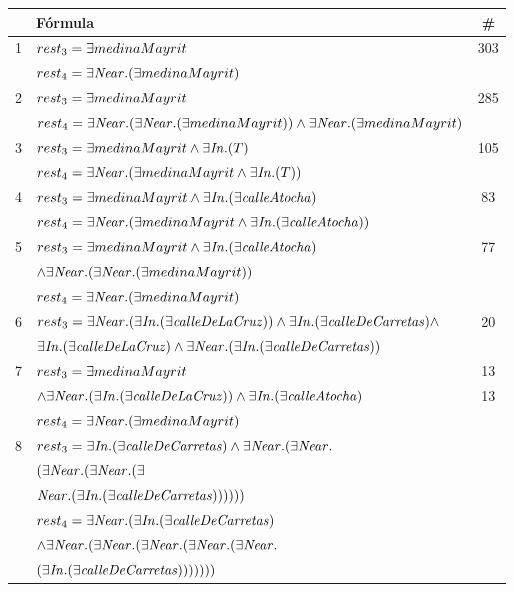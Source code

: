 \begin{table}[H]
\begin{center}
\begin{tabular}{|l|l|c|}
\hline
&F\'ormula			      &  \# \\ \hline \hline

1&$rest_3 = \exists medinaMayrit$ &303\\
 &$rest_4 = \exists \mathit{Near}.(\exists medinaMayrit)$& \\ \hline

2&$rest_3 = \exists medinaMayrit$ & 285\\  
 &$rest_4 =  \exists \mathit{Near}. (\exists \mathit{Near}.(\exists medinaMayrit)) \land \exists \mathit{Near}.(\exists medinaMayrit)$& \\ \hline

3&$rest_3 =\exists medinaMayrit \land \exists \mathit{In}.(T)$ & 105\\ 
 &$rest_4 =\exists \mathit{Near}.(\exists medinaMayrit \land \exists \mathit{In}.(T))$& \\ \hline

4&$rest_3 =\exists medinaMayrit \land \exists \mathit{In}.(\exists \mathit{calleAtocha})$ &83 \\ 
 &$rest_4 =\exists \mathit{Near}.(\exists medinaMayrit  \land \exists \mathit{In}.(\exists \mathit{calleAtocha}))$& \\ \hline

5&$rest_3 =\exists medinaMayrit  \land \exists \mathit{In}.(\exists \mathit{calleAtocha})$&77 \\ 
 &$\land \exists \mathit{Near}.(\exists \mathit{Near}.(\exists medinaMayrit))$& \\
&$rest_4 = \exists \mathit{Near}.(\exists medinaMayrit)$& \\ \hline

6&$rest_3 =\exists \mathit{Near}.(\exists \mathit{In}.(\exists \mathit{calleDeLaCruz}))  \land \exists \mathit{In}.(\exists \mathit{calleDeCarretas}) \land $ & 20\\
&$\exists \mathit{In}.(\exists \mathit{calleDeLaCruz})  \land \exists \mathit{Near}.(\exists \mathit{In}.(\exists \mathit{calleDeCarretas}))$& \\ \hline

7&$rest_3 =\exists medinaMayrit  $&13 \\ 
&$\land \exists \mathit{Near}.(\exists \mathit{In}.(\exists \mathit{calleDeLaCruz}))  \land \exists \mathit{In}.(\exists \mathit{calleAtocha})$ & 13\\
&$rest_4 = \exists \mathit{Near}.(\exists medinaMayrit)$&\\ \hline

8&$rest_3 =\exists \mathit{In}.(\exists \mathit{calleDeCarretas})  \land \exists \mathit{Near}.(\exists \mathit{Near}.$&\\
&$(\exists \mathit{Near}.(\exists \mathit{Near}.(\exists$ &\\
&$ \mathit{Near}.(\exists \mathit{In}.(\exists \mathit{calleDeCarretas})))))) $&\\
&$rest_4 = \exists \mathit{Near}.(\exists \mathit{In}.(\exists \mathit{calleDeCarretas})  $ & \\
&$\land \exists \mathit{Near}.(\exists \mathit{Near}.(\exists \mathit{Near}.(\exists \mathit{Near}.(\exists \mathit{Near}.$&\\
&$(\exists \mathit{In}.(\exists \mathit{calleDeCarretas})))))))$&\\ \hline


\end{tabular}
\end{center}
\end{table}
